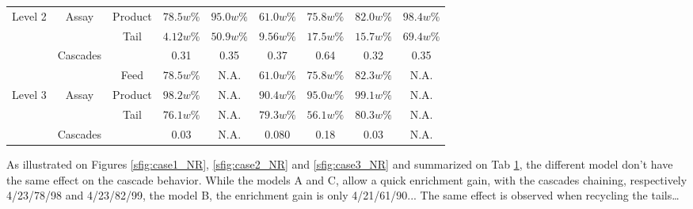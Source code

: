 \begin{table}[h!]
\begin{tabular}{ccccccccc}
Level 2 & Assay      & Product   & $78.5w\%$ & $95.0w\%$ & $61.0w\%$ & $75.8w\%$ & $82.0w\%$ & $98.4w\%$ \\
        &            & Tail      & $4.12w\%$ & $50.9w\%$ & $9.56w\%$ & $17.5w\%$ & $15.7w\%$ & $69.4w\%$ \\
        & Cascades   &           & 0.31      & 0.35      & 0.37      & 0.64      & 0.32      & 0.35      \\
\midrule                                                                                                 
        &            & Feed      & $78.5w\%$ & N.A.      & $61.0w\%$ & $75.8w\%$ & $82.3w\%$ & N.A.      \\
Level 3 & Assay      & Product   & $98.2w\%$ & N.A.      & $90.4w\%$ & $95.0w\%$ & $99.1w\%$ & N.A.      \\
        &            & Tail      & $76.1w\%$ & N.A.      & $79.3w\%$ & $56.1w\%$ & $80.3w\%$ & N.A.      \\
        & Cascades   &           & 0.03      & N.A.      & 0.080     & 0.18      & 0.03      & N.A.      \\
\bottomrule
\end{tabular}
  \label{tab:level}
\end{table}

As illustrated on Figures \ref{sfig:case1_NR}, \ref{sfig:case2_NR} and
\ref{sfig:case3_NR} and summarized on Tab \ref{tab:level}, the different model
don't have the same effect on the cascade behavior. While the models A and C,
allow a quick enrichment gain, with the cascades chaining, respectively
4/23/78/98 and 4/23/82/99, the model B, the enrichment gain is only
4/21/61/90...  The same effect is observed when recycling the tails\ldots


